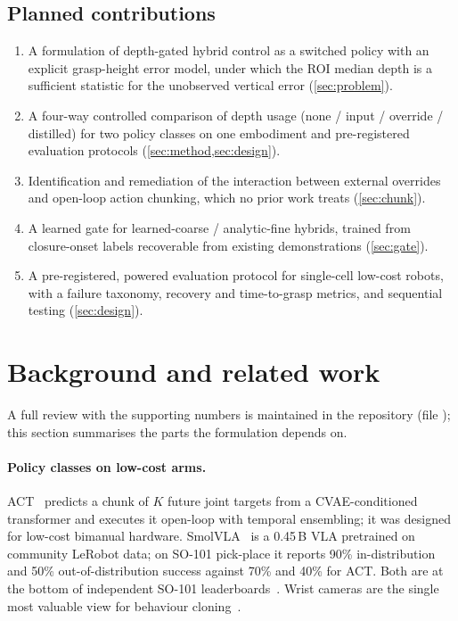 \documentclass[11pt,a4paper]{article}
\theoremstyle{definition}
\begin{document}
\subsection{Planned contributions}
\begin{enumerate}[leftmargin=*,itemsep=2pt]
  \item A formulation of depth-gated hybrid control as a switched policy with an explicit grasp-height error model, under which the ROI median depth is a sufficient statistic for the unobserved vertical error (\cref{sec:problem}).
  \item A four-way controlled comparison of depth usage (none / input / override / distilled) for two policy classes on one embodiment and pre-registered evaluation protocols (\cref{sec:method,sec:design}).
  \item Identification and remediation of the interaction between external overrides and open-loop action chunking, which no prior work treats (\cref{sec:chunk}).
  \item A learned gate for learned-coarse / analytic-fine hybrids, trained from closure-onset labels recoverable from existing demonstrations (\cref{sec:gate}).
  \item A pre-registered, powered evaluation protocol for single-cell low-cost robots, with a failure taxonomy, recovery and time-to-grasp metrics, and sequential testing (\cref{sec:design}).
\end{enumerate}

\section{Background and related work}
\label{sec:related}

A full review with the supporting numbers is maintained in the repository (file ); this section summarises the parts the formulation depends on.

\paragraph{Policy classes on low-cost arms.}
ACT~\citep{zhao2023act} predicts a chunk of $K$ future joint targets from a CVAE-conditioned transformer and executes it open-loop with temporal ensembling; it was designed for low-cost bimanual hardware. SmolVLA~\citep{shukor2025smolvla} is a 0.45\,B VLA pretrained on community LeRobot data; on SO-101 pick-place it reports 90\% in-distribution and 50\% out-of-distribution success against 70\% and 40\% for ACT. Both are at the bottom of independent SO-101 leaderboards~\citep{yu2026so101,armnetbench2026}. Wrist cameras are the single most valuable view for behaviour cloning~\citep{hsu2022hands}.
\end{document}
